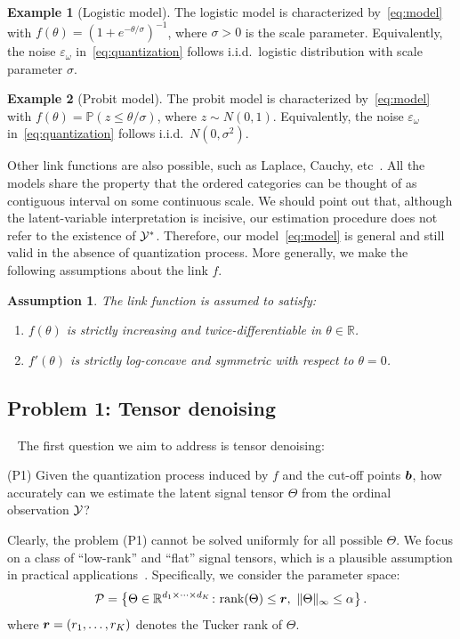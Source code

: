 \documentclass{article}
\theoremstyle{plain}
\newtheorem{assumption}{Assumption}
\theoremstyle{definition}
\newtheorem{example}{Example}
\begin{document}
\begin{example}[Logistic model] The logistic model is characterized by~\eqref{eq:model} with $f(\theta)=(1+e^{-\theta/\sigma})^{-1}$, where $\sigma>0$ is the scale parameter. Equivalently, the noise $\varepsilon_\omega$ in~\eqref{eq:quantization} follows i.i.d.\ logistic distribution with scale parameter $\sigma$.
\end{example}
\begin{example}[Probit model] The probit model is characterized by~\eqref{eq:model} with
$f(\theta)=\mathbb{P}(z\leq \theta/\sigma)$, where $z\sim N(0,1)$. Equivalently, the noise $\varepsilon_\omega$ in~\eqref{eq:quantization} follows i.i.d.\ $N(0,\sigma^2)$.
\end{example}
Other link functions are also possible, such as Laplace, Cauchy, etc~\cite{mccullagh1980regression}. All the models share the property that the ordered categories can be thought of as contiguous interval on some continuous scale. We should point out that, although the latent-variable interpretation is incisive, our estimation procedure does not refer to the existence of $\mathcal{Y}^*$. Therefore, our model~\eqref{eq:model} is general and still valid in the absence of quantization process. More generally, we make the following assumptions about the link $f$.

\begin{assumption}\label{ass:link}
The link function is assumed to satisfy:
\vspace{-.2cm}
\begin{enumerate}
\item $f(\theta)$ is strictly increasing and twice-differentiable in $\theta\in \mathbb{R}$.
\item $f'(\theta)$ is strictly log-concave and symmetric with respect to $\theta=0$.
\end{enumerate}
\end{assumption}

\subsection{Problem 1: Tensor denoising}~\label{sec:denoising}
The first question we aim to address is tensor denoising:

(P1) Given the quantization process induced by $f$ and the cut-off points $\bm{b}$, how accurately can we estimate the latent signal tensor $\Theta$ from the ordinal observation $\mathcal{Y}$?

Clearly, the problem (P1) cannot be solved uniformly for all possible $\Theta$. We focus on a class of ``low-rank'' and ``flat'' signal tensors, which is a plausible assumption in practical applications~\cite{zhou2013tensor,bhaskar20151}. Specifically, we consider the parameter space:
\begin{equation}\label{eq:space}
\mathcal{P}=\left\{\Theta\in\mathbb{R}^{d_1\times \cdots \times d_K} \colon \text{rank}(\Theta)\leq \bm{r},\ \lVert\Theta\rVert_\infty\leq \alpha\right\}.
\end{equation}
where $\bm{r}=(r_1,\ldots,r_K)$ denotes the Tucker rank of $\Theta$.
\end{document}
